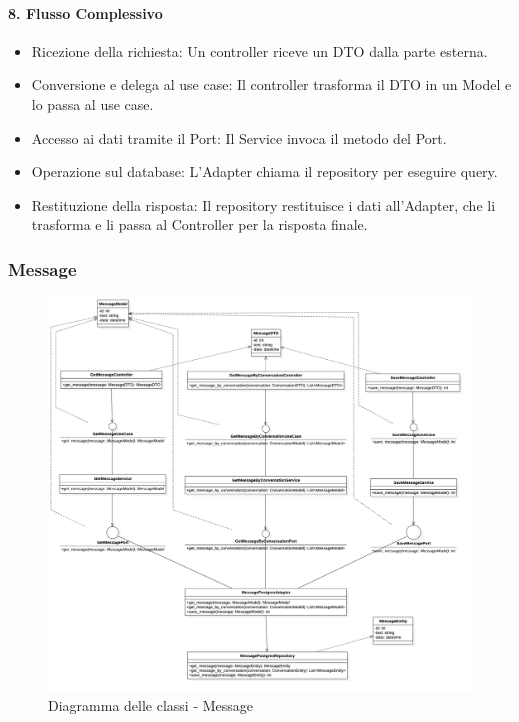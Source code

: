     \paragraph{8. Flusso Complessivo}
    \begin{itemize}
        \item Ricezione della richiesta: Un controller riceve un DTO dalla parte esterna.
        \item Conversione e delega al use case: Il controller trasforma il DTO in un Model e lo passa al use case.
        \item Accesso ai dati tramite il Port: Il Service invoca il metodo del Port.
        \item Operazione sul database: L'Adapter chiama il repository per eseguire query.
        \item Restituzione della risposta: Il repository restituisce i dati all'Adapter, che li trasforma e li passa al Controller per la risposta finale.
    \end{itemize}

    \subsubsection{Message}
    \begin{figure}[H]
        \centering
        \includegraphics[width=\linewidth, height=0.8\textheight, keepaspectratio]{./img/Message.png}
        \caption{Diagramma delle classi - Message}
        \label{fig:message}
    \end{figure}

